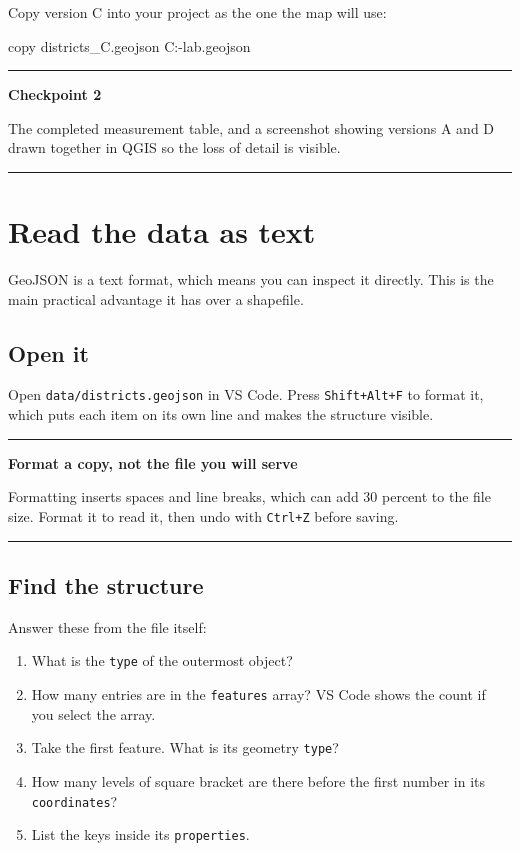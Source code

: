 \documentclass{article}
\newcommand{\cd}[1]{\texttt{#1}}
\newenvironment{keypoint}[1]
  {\par\vspace{.7em}\noindent\rule{\linewidth}{.6pt}\par\vspace{.15em}
   \noindent\textbf{#1}\par\nobreak\vspace{-.3em}}
  {\par\vspace{.15em}\noindent\rule{\linewidth}{.6pt}\par\vspace{.7em}}
\begin{document}
\vspace{1em}
Copy version C into your project as the one the map will use:

\begin{code}
copy districts_C.geojson C:\webgis-lab\data\districts.geojson
\end{code}

\begin{keypoint}{Checkpoint 2}
The completed measurement table, and a screenshot showing versions A and
D drawn together in QGIS so the loss of detail is visible.
\end{keypoint}


\section{Read the data as text}

GeoJSON is a text format, which means you can inspect it directly. This
is the main practical advantage it has over a shapefile.

\subsection{Open it}

Open \cd{data/districts.geojson} in VS Code. Press
\cd{Shift+Alt+F} to format it, which puts each item on its own line and
makes the structure visible.

\begin{keypoint}{Format a copy, not the file you will serve}
Formatting inserts spaces and line breaks, which can add 30 percent to
the file size. Format it to read it, then undo with \cd{Ctrl+Z} before
saving.
\end{keypoint}


\subsection{Find the structure}

Answer these from the file itself:

\begin{enumerate}
  \item What is the \cd{type} of the outermost object?
  \item How many entries are in the \cd{features} array? VS Code shows
        the count if you select the array.
  \item Take the first feature. What is its geometry \cd{type}?
  \item How many levels of square bracket are there before the first
        number in its \cd{coordinates}?
  \item List the keys inside its \cd{properties}.
\end{enumerate}
\end{document}
